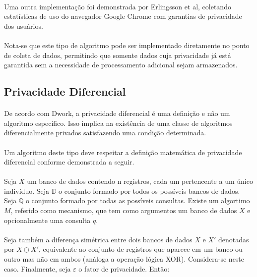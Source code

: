 \paragraph{} Uma outra implementação foi demonstrada por Erlingsson et al\cite{erlingsson2014rappor}, coletando estatísticas de uso do navegador Google Chrome com garantias de privacidade dos usuários.

\paragraph{} Nota-se que este tipo de algoritmo pode ser implementado diretamente no ponto de coleta de dados, permitindo que somente dados cuja privacidade já está garantida sem a necessidade de processamento adicional sejam armazenados.

\subsection{Privacidade Diferencial}

\paragraph{} De acordo com Dwork\cite{dwork2008differential}, a privacidade diferencial é uma definição e não um algoritmo específico. Isso implica na existência de uma classe de algoritmos diferencialmente privados satisfazendo uma condição determinada.

\paragraph{} Um algoritmo deste tipo deve respeitar a definição matemática de privacidade diferencial\cite{dwork2011differential} conforme demonstrada a seguir.

\paragraph{} Seja $X$ um banco de dados contendo n registros, cada um pertencente a um único indivíduo. 
Seja $\mathbb{D}$ o conjunto formado por todos os possíveis bancos de dados. 
Seja $\mathbb{Q}$ o conjunto formado por todas as possíveis consultas. Existe um algortimo $M$, referido como mecanismo, que tem como argumentos um banco de dados $X$ e opcionalmente uma consulta $q$.

\paragraph{} Seja também a diferença simétrica entre dois bancos de dados $X$ e $X'$ denotadas por $X \ominus X'$, equivalente ao conjunto de registros que aparece em um banco ou outro mas não em ambos (análoga a operação lógica XOR). Considera-se neste caso. Finalmente, seja $\varepsilon$ o fator de privacidade. Então:

